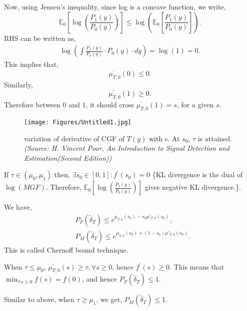 \documentclass[a4paper,english,12pt]{article}
\begin{document}
Now, using Jensen's inequality, since log is a concave function, we write,
\begin{equation}
\mathbb{E}_0\left[\log\left(\frac{P_1(y)}{P_0(y)}\right)\right]\leq\log\left(\mathbb{E}_0\left[\frac{P_1(y)}{P_0(y)}\right]\right).
\end{equation}
RHS can be written as,
\begin{align}
\log\left(\int{\frac{P_1(y)}{P_0(y)}\cdot P_0(y) }\cdot dy\right)
=\log(1)
=0.
\end{align}
This implies that,
\begin{equation}
\mu^\prime_{T,0}(0)\leq 0.
\end{equation}
Similarly,
\begin{equation}
\mu^\prime_{T,0}(1)\geq 0.
\end{equation}
Therefore between $0$ and $1$, it should cross $\mu^\prime_{T,0}(1)=s$, for a given $s$.
\begin{figure}[hbtp]
	\centering
	\texttt{[image: Figures/Untitled1.jpg]}
	\caption{variation of derivative of CGF of $T(y)$ with s. At $s_0$, $\tau$ is attained. \textit{(Source: H. Vincent Poor, An Introduction to Signal Detection and Estimation(Second Edition))}}
	\label{fn2}
\end{figure}
\begin{rem}
If $\tau\in(\mu_0,\mu_1)$ then, $\exists s_0\in[0,1]:f^\prime(s_0)=0$ \{KL divergence is the dual of $\log(MGF)$. Therefore, $\mathbb{E}_0\left[\log\left(\frac{P_1(y)}{P_0(y)}\right)\right]$ gives negative KL divergence.\}.
\end{rem}
We have,
\begin{align}\label{eqn:peb3}
&P_F(\tilde\delta_T)\leq e^{\mu_{T,0}(s_0)-s_0\mu\prime_{T,0}(s_0)},\\\label{eqn:peb4}
&P_M(\tilde\delta_T)\leq e^{\mu_{T,0}(s_0)+(1-s_0)\mu\prime_{T,0}(s_0)}.
\end{align}
This is called Chernoff bound technique.
\begin{note}
When $\tau\leq \mu_0$, $\mu^\prime_{T,0}(s)\geq \tau,\forall s\geq 0$, hence $f^\prime(s)\geq 0$. This means that $\min_{\forall s \geq 0}{f(s)}=f(0)$, and hence $P_F(\tilde\delta_T) \leq 1$.
\end{note}
\begin{note}
Similar to above, when $\tau\geq\mu_1$, we get, $P_M(\tilde\delta_T)\leq 1$.
\end{note}
\end{document}
